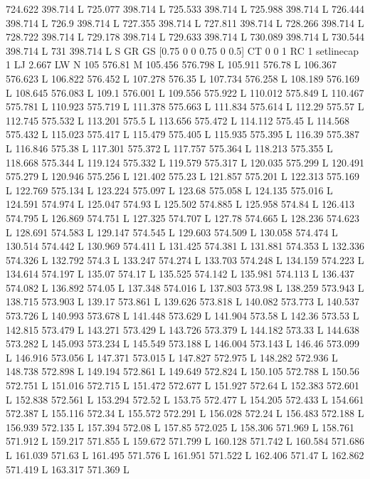 724.622 398.714 L
725.077 398.714 L
725.533 398.714 L
725.988 398.714 L
726.444 398.714 L
726.9 398.714 L
727.355 398.714 L
727.811 398.714 L
728.266 398.714 L
728.722 398.714 L
729.178 398.714 L
729.633 398.714 L
730.089 398.714 L
730.544 398.714 L
731 398.714 L
S
GR
GS
[0.75 0 0 0.75 0 0.5] CT
0 0 1 RC
1 setlinecap
1 LJ
2.667 LW
N
105 576.81 M
105.456 576.798 L
105.911 576.78 L
106.367 576.623 L
106.822 576.452 L
107.278 576.35 L
107.734 576.258 L
108.189 576.169 L
108.645 576.083 L
109.1 576.001 L
109.556 575.922 L
110.012 575.849 L
110.467 575.781 L
110.923 575.719 L
111.378 575.663 L
111.834 575.614 L
112.29 575.57 L
112.745 575.532 L
113.201 575.5 L
113.656 575.472 L
114.112 575.45 L
114.568 575.432 L
115.023 575.417 L
115.479 575.405 L
115.935 575.395 L
116.39 575.387 L
116.846 575.38 L
117.301 575.372 L
117.757 575.364 L
118.213 575.355 L
118.668 575.344 L
119.124 575.332 L
119.579 575.317 L
120.035 575.299 L
120.491 575.279 L
120.946 575.256 L
121.402 575.23 L
121.857 575.201 L
122.313 575.169 L
122.769 575.134 L
123.224 575.097 L
123.68 575.058 L
124.135 575.016 L
124.591 574.974 L
125.047 574.93 L
125.502 574.885 L
125.958 574.84 L
126.413 574.795 L
126.869 574.751 L
127.325 574.707 L
127.78 574.665 L
128.236 574.623 L
128.691 574.583 L
129.147 574.545 L
129.603 574.509 L
130.058 574.474 L
130.514 574.442 L
130.969 574.411 L
131.425 574.381 L
131.881 574.353 L
132.336 574.326 L
132.792 574.3 L
133.247 574.274 L
133.703 574.248 L
134.159 574.223 L
134.614 574.197 L
135.07 574.17 L
135.525 574.142 L
135.981 574.113 L
136.437 574.082 L
136.892 574.05 L
137.348 574.016 L
137.803 573.98 L
138.259 573.943 L
138.715 573.903 L
139.17 573.861 L
139.626 573.818 L
140.082 573.773 L
140.537 573.726 L
140.993 573.678 L
141.448 573.629 L
141.904 573.58 L
142.36 573.53 L
142.815 573.479 L
143.271 573.429 L
143.726 573.379 L
144.182 573.33 L
144.638 573.282 L
145.093 573.234 L
145.549 573.188 L
146.004 573.143 L
146.46 573.099 L
146.916 573.056 L
147.371 573.015 L
147.827 572.975 L
148.282 572.936 L
148.738 572.898 L
149.194 572.861 L
149.649 572.824 L
150.105 572.788 L
150.56 572.751 L
151.016 572.715 L
151.472 572.677 L
151.927 572.64 L
152.383 572.601 L
152.838 572.561 L
153.294 572.52 L
153.75 572.477 L
154.205 572.433 L
154.661 572.387 L
155.116 572.34 L
155.572 572.291 L
156.028 572.24 L
156.483 572.188 L
156.939 572.135 L
157.394 572.08 L
157.85 572.025 L
158.306 571.969 L
158.761 571.912 L
159.217 571.855 L
159.672 571.799 L
160.128 571.742 L
160.584 571.686 L
161.039 571.63 L
161.495 571.576 L
161.951 571.522 L
162.406 571.47 L
162.862 571.419 L
163.317 571.369 L
